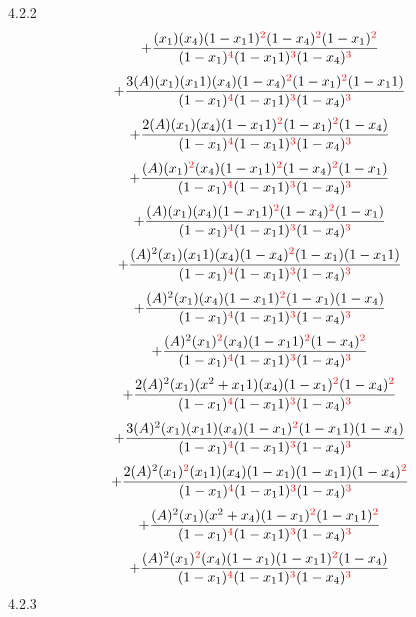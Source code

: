 \documentclass{article}
\begin{document}
4.2.2
\[+\frac{(x_1)(x_4)(1-x_11)^{\textcolor{red}{2}}(1-x_4)^{\textcolor{red}{2}}(1-x_1)^{\textcolor{red}{2}}}{(1-x_1)^{\textcolor{red}{4}}(1-x_11)^{\textcolor{red}{3}}(1-x_4)^{\textcolor{red}{3}}}\]\[+\frac{3(A)(x_1)(x_11)(x_4)(1-x_4)^{\textcolor{red}{2}}(1-x_1)^{\textcolor{red}{2}}(1-x_11)}{(1-x_1)^{\textcolor{red}{4}}(1-x_11)^{\textcolor{red}{3}}(1-x_4)^{\textcolor{red}{3}}}\]\[+\frac{2(A)(x_1)(x_4)(1-x_11)^{\textcolor{red}{2}}(1-x_1)^{\textcolor{red}{2}}(1-x_4)}{(1-x_1)^{\textcolor{red}{4}}(1-x_11)^{\textcolor{red}{3}}(1-x_4)^{\textcolor{red}{3}}}\]\[+\frac{(A)(x_1)^{\textcolor{red}{2}}(x_4)(1-x_11)^{\textcolor{red}{2}}(1-x_4)^{\textcolor{red}{2}}(1-x_1)}{(1-x_1)^{\textcolor{red}{4}}(1-x_11)^{\textcolor{red}{3}}(1-x_4)^{\textcolor{red}{3}}}\]\[+\frac{(A)(x_1)(x_4)(1-x_11)^{\textcolor{red}{2}}(1-x_4)^{\textcolor{red}{2}}(1-x_1)}{(1-x_1)^{\textcolor{red}{4}}(1-x_11)^{\textcolor{red}{3}}(1-x_4)^{\textcolor{red}{3}}}\]\[+\frac{(A)^{2}(x_1)(x_11)(x_4)(1-x_4)^{\textcolor{red}{2}}(1-x_1)(1-x_11)}{(1-x_1)^{\textcolor{red}{4}}(1-x_11)^{\textcolor{red}{3}}(1-x_4)^{\textcolor{red}{3}}}\]\[+\frac{(A)^{2}(x_1)(x_4)(1-x_11)^{\textcolor{red}{2}}(1-x_1)(1-x_4)}{(1-x_1)^{\textcolor{red}{4}}(1-x_11)^{\textcolor{red}{3}}(1-x_4)^{\textcolor{red}{3}}}\]\[+\frac{(A)^{2}(x_1)^{\textcolor{red}{2}}(x_4)(1-x_11)^{\textcolor{red}{2}}(1-x_4)^{\textcolor{red}{2}}}{(1-x_1)^{\textcolor{red}{4}}(1-x_11)^{\textcolor{red}{3}}(1-x_4)^{\textcolor{red}{3}}}\]\[+\frac{2(A)^{2}(x_1)(x^{2}+x_11)(x_4)(1-x_1)^{\textcolor{red}{2}}(1-x_4)^{\textcolor{red}{2}}}{(1-x_1)^{\textcolor{red}{4}}(1-x_11)^{\textcolor{red}{3}}(1-x_4)^{\textcolor{red}{3}}}\]\[+\frac{3(A)^{2}(x_1)(x_11)(x_4)(1-x_1)^{\textcolor{red}{2}}(1-x_11)(1-x_4)}{(1-x_1)^{\textcolor{red}{4}}(1-x_11)^{\textcolor{red}{3}}(1-x_4)^{\textcolor{red}{3}}}\]\[+\frac{2(A)^{2}(x_1)^{\textcolor{red}{2}}(x_11)(x_4)(1-x_1)(1-x_11)(1-x_4)^{\textcolor{red}{2}}}{(1-x_1)^{\textcolor{red}{4}}(1-x_11)^{\textcolor{red}{3}}(1-x_4)^{\textcolor{red}{3}}}\]\[+\frac{(A)^{2}(x_1)(x^{2}+x_4)(1-x_1)^{\textcolor{red}{2}}(1-x_11)^{\textcolor{red}{2}}}{(1-x_1)^{\textcolor{red}{4}}(1-x_11)^{\textcolor{red}{3}}(1-x_4)^{\textcolor{red}{3}}}\]\[+\frac{(A)^{2}(x_1)^{\textcolor{red}{2}}(x_4)(1-x_1)(1-x_11)^{\textcolor{red}{2}}(1-x_4)}{(1-x_1)^{\textcolor{red}{4}}(1-x_11)^{\textcolor{red}{3}}(1-x_4)^{\textcolor{red}{3}}}\]
4.2.3
\end{document}
